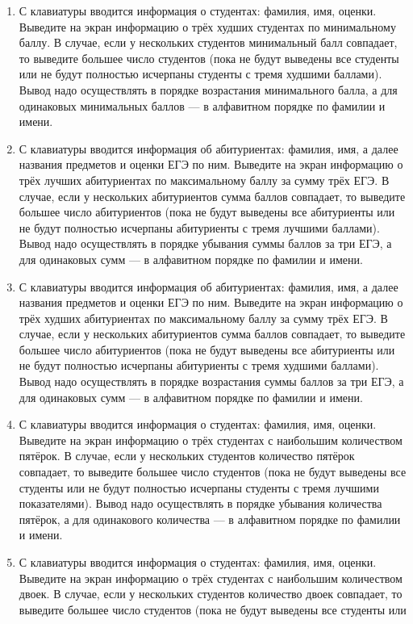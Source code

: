 \begin{enumerate}
для одинаковых максимальных баллов — в алфавитном порядке по фамилии и имени.
\item С клавиатуры вводится информация о студентах: фамилия, имя, оценки. Выведите на экран информацию о трёх худших студентах по минимальному баллу. В случае,
если у нескольких студентов минимальный балл совпадает, то выведите большее число студентов (пока не будут выведены все студенты или
не будут полностью исчерпаны студенты с тремя худшими баллами). Вывод надо осуществлять в порядке возрастания минимального балла, а
для одинаковых минимальных баллов — в алфавитном порядке по фамилии и имени.
\item С клавиатуры вводится информация об абитуриентах: фамилия, имя, а далее названия предметов и оценки ЕГЭ по ним. Выведите на экран информацию о трёх лучших абитуриентах по максимальному баллу за сумму трёх ЕГЭ. В случае,
если у нескольких абитуриентов сумма баллов совпадает, то выведите большее число абитуриентов (пока не будут выведены все абитуриенты или
не будут полностью исчерпаны абитуриенты с тремя лучшими баллами). Вывод надо осуществлять в порядке убывания суммы баллов за три ЕГЭ, а
для одинаковых сумм — в алфавитном порядке по фамилии и имени.
\item С клавиатуры вводится информация об абитуриентах: фамилия, имя, а далее названия предметов и оценки ЕГЭ по ним. Выведите на экран информацию о трёх худших абитуриентах по максимальному баллу за сумму трёх ЕГЭ. В случае,
если у нескольких абитуриентов сумма баллов совпадает, то выведите большее число абитуриентов (пока не будут выведены все абитуриенты или
не будут полностью исчерпаны абитуриенты с тремя худшими баллами). Вывод надо осуществлять в порядке возрастания суммы баллов за три ЕГЭ, а
для одинаковых сумм — в алфавитном порядке по фамилии и имени.
\item С клавиатуры вводится информация о студентах: фамилия, имя, оценки. Выведите на экран информацию о трёх студентах с наибольшим количеством пятёрок. В случае,
если у нескольких студентов количество пятёрок совпадает, то выведите большее число студентов (пока не будут выведены все студенты или
не будут полностью исчерпаны студенты с тремя лучшими показателями). Вывод надо осуществлять в порядке убывания количества пятёрок, а
для одинакового количества — в алфавитном порядке по фамилии и имени.
\item С клавиатуры вводится информация о студентах: фамилия, имя, оценки. Выведите на экран информацию о трёх студентах с наибольшим количеством двоек. В случае,
если у нескольких студентов количество двоек совпадает, то выведите большее число студентов (пока не будут выведены все студенты или

\end{enumerate}
